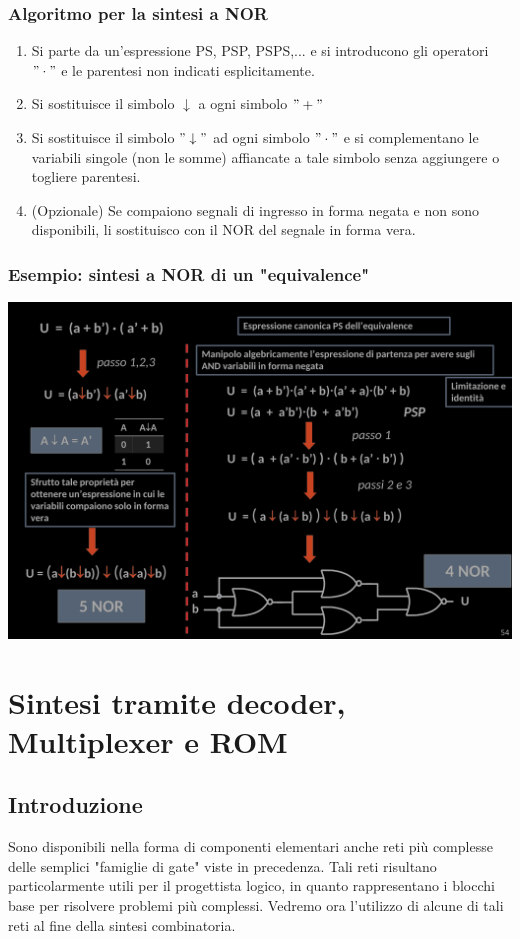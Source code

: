 \documentclass{article}
\begin{document}
\subsubsection{Algoritmo per la sintesi a NOR}
\begin{enumerate}
    \item Si parte da un'espressione PS, PSP, PSPS,... e si introducono gli operatori $"\cdot"$ e le parentesi non indicati esplicitamente.
    \item Si sostituisce il simbolo $\downarrow $ a ogni simbolo $"+"$
    \item Si sostituisce il simbolo $"\downarrow"$ ad ogni simbolo $"\cdot"$ e si complementano le variabili singole (non le somme) affiancate a tale simbolo senza aggiungere o togliere parentesi.
    \item (Opzionale) Se compaiono segnali di ingresso in forma negata e non sono disponibili, li sostituisco con il NOR del segnale in forma vera.
\end{enumerate}
\subsubsection*{Esempio: sintesi a NOR di un "equivalence"}
\begin{center}
    \includegraphics[scale=0.55]{equivalence.png}
\end{center}
\section{Sintesi tramite decoder, Multiplexer e ROM}
\subsection{Introduzione}
Sono disponibili nella forma di componenti elementari anche reti più complesse delle semplici "famiglie di gate" viste in precedenza. Tali reti risultano particolarmente utili per il progettista logico, in quanto rappresentano i blocchi base per risolvere problemi più complessi. Vedremo ora l’utilizzo di alcune di tali reti al fine della sintesi combinatoria.
\end{document}
